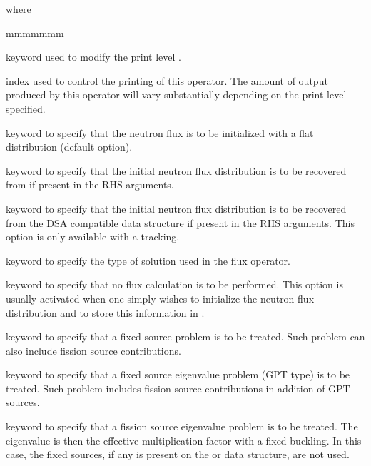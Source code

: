 \goodbreak
\noindent where
\begin{ListeDeDescription}{mmmmmmm}

\item[\moc{EDIT}] keyword used to modify the print level .

\item[\dusa{iprint}] index used to control the printing of this operator. The
amount of output produced by this operator will vary substantially
depending on the print level specified. 

\item[\moc{OFF}] keyword to specify that the neutron flux
is to be initialized with a flat distribution (default option).

\item[\moc{ON}] keyword to specify that the initial neutron flux distribution
is to be recovered from  if present in the RHS arguments.

\item[\moc{DSA}] keyword to specify that the initial neutron flux distribution
is to be recovered from the DSA compatible data structure  if present in the RHS arguments.
This option is only available with a  tracking.

\item[\moc{TYPE}] keyword to specify the type of solution used in the flux
operator.

\item[\moc{N}] keyword to specify that no flux calculation is to be performed.
This option is usually activated when one simply wishes to initialize the
neutron flux distribution and to store this information in .

\item[\moc{S}]  keyword to specify that a fixed source problem is to be
treated. Such problem can also include fission source contributions.

\item[\moc{P}]  keyword to specify that a fixed source eigenvalue problem (GPT type) is to be
treated. Such problem includes fission source contributions in addition of GPT sources.

\item[\moc{K}] keyword to specify that a fission source eigenvalue problem is
to be treated. The eigenvalue is then the effective multiplication factor with a
fixed buckling. In this case, the fixed sources, if any is present on the
 or  data structure, are not used.  


\end{ListeDeDescription}
